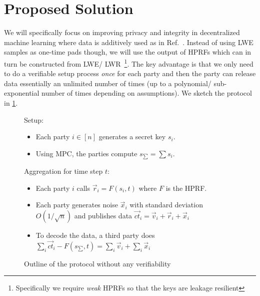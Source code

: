 \newcommand{\summedSK}{s_{\sum}}

\section{Proposed Solution}
We will specifically focus on improving privacy and integrity in decentralized machine learning where data is additively used as in Ref.~\cite{stevens2021efficientdifferentiallyprivatesecure}.
Instead of using LWE samples as one-time pads though, we will use the output of HPRFs which can in turn be constructed from LWE/ LWR~\footnote{Specifically we require \emph{weak} HPRFs so that the keys are leakage resilient}.
The key advantage is that we only need to do a verifiable setup process \emph{once} for each party and then the party can release data essentially an unlimited number of times (up to a polynomial/ sub-exponential number of times depending on assumptions).
We sketch the protocol in \cref{fig:protSimp}.

\begin{figure}[H]
	\begin{mdframed}
		Setup: \begin{itemize}
			\item Each party $i \in [n]$ generates a secret key $s_i.$
			\item Using MPC, the parties compute $\summedSK = \sum s_i.$
		\end{itemize}
		Aggregation for time step $t$: \begin{itemize}
			\item Each party $i$ calls $\vec{r}_i = F(s_i, t)$  where $F$ is the HPRF.
			\item Each party generates noise $\vec{x}_i$ with standard deviation $O(1/\sqrt{n})$ and publishes data $\overrightarrow{ct}_i = \vec{v}_i + \vec{r}_i + \vec{x}_i$ 
			\item To decode the data, a third party does $\sum_i \overrightarrow{ct}_i - F(\summedSK, t) = \sum_i \vec{v}_i + \sum_i \vec{x}_i$
		\end{itemize}
	\end{mdframed}
	\caption{Outline of the protocol without any verifiability}
	\label{fig:protSimp}
\end{figure}


